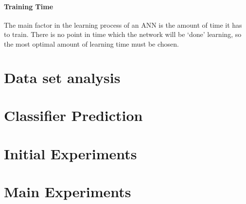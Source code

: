 \documentclass[12pt]{article}
\begin{document}
        \paragraph{Training Time}
          The main factor in the learning process of an ANN is the amount of time it has to train. There is no point in time which the network will be ‘done’ learning, so the most optimal amount of learning time must be chosen.

\section{Data set analysis}

\section{Classifier Prediction}



\section{Initial Experiments}



\section{Main Experiments}
\end{document}
